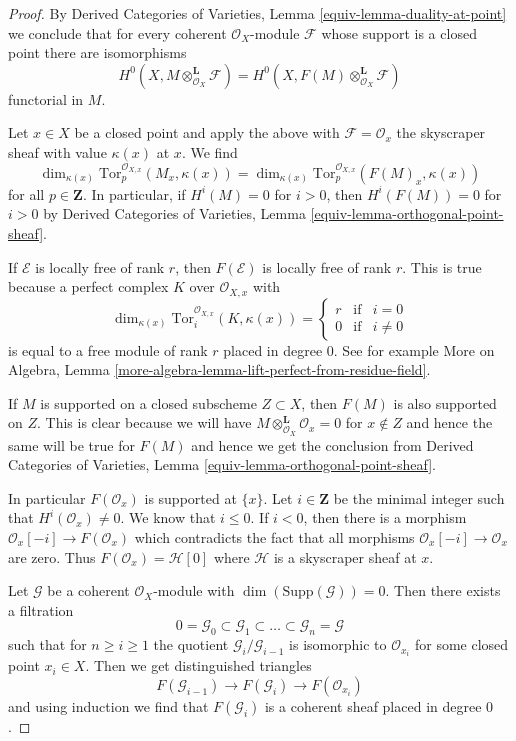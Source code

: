 \begin{proof}
By Derived Categories of Varieties, Lemma \ref{equiv-lemma-duality-at-point}
we conclude that for every
coherent $\mathcal{O}_X$-module $\mathcal{F}$ whose support is a
closed point there are isomorphisms
$$
H^0(X, M \otimes^\mathbf{L}_{\mathcal{O}_X} \mathcal{F}) =
H^0(X, F(M) \otimes^\mathbf{L}_{\mathcal{O}_X} \mathcal{F})
$$
functorial in $M$.

\medskip\noindent
Let $x \in X$ be a closed point and apply the above with
$\mathcal{F} = \mathcal{O}_x$ the skyscraper sheaf with value
$\kappa(x)$ at $x$. We find
$$
\dim_{\kappa(x)} 
\text{Tor}^{\mathcal{O}_{X, x}}_p(M_x, \kappa(x)) =
\dim_{\kappa(x)} 
\text{Tor}^{\mathcal{O}_{X, x}}_p(F(M)_x, \kappa(x))
$$
for all $p \in \mathbf{Z}$. In particular, if
$H^i(M) = 0$ for $i > 0$, then $H^i(F(M)) = 0$ for $i > 0$
by Derived Categories of Varieties, Lemma
\ref{equiv-lemma-orthogonal-point-sheaf}.

\medskip\noindent
If $\mathcal{E}$ is locally free of rank $r$, then
$F(\mathcal{E})$ is locally free of rank $r$. This is
true because a perfect complex $K$ over $\mathcal{O}_{X, x}$
with
$$
\dim_{\kappa(x)} \text{Tor}^{\mathcal{O}_{X, x}}_i(K, \kappa(x)) =
\left\{
\begin{matrix}
r & \text{if} & i = 0 \\
0 & \text{if} & i \not = 0
\end{matrix}
\right.
$$
is equal to a free module of rank $r$ placed in degree $0$. See
for example More on Algebra, Lemma
\ref{more-algebra-lemma-lift-perfect-from-residue-field}.

\medskip\noindent
If $M$ is supported on a closed subscheme $Z \subset X$, then
$F(M)$ is also supported on $Z$. This is clear because
we will have $M \otimes_{\mathcal{O}_X}^\mathbf{L} \mathcal{O}_x = 0$
for $x \not \in Z$ and hence the same will be true for $F(M)$
and hence we get the conclusion from
Derived Categories of Varieties, Lemma
\ref{equiv-lemma-orthogonal-point-sheaf}.

\medskip\noindent
In particular $F(\mathcal{O}_x)$ is supported at $\{x\}$.
Let $i \in \mathbf{Z}$ be the minimal integer such that
$H^i(\mathcal{O}_x) \not = 0$. We know that $i \leq 0$.
If $i < 0$, then there is a morphism
$\mathcal{O}_x[-i] \to F(\mathcal{O}_x)$
which contradicts the fact that all morphisms
$\mathcal{O}_x[-i] \to \mathcal{O}_x$ are zero.
Thus $F(\mathcal{O}_x) = \mathcal{H}[0]$ where
$\mathcal{H}$ is a skyscraper sheaf at $x$.

\medskip\noindent
Let $\mathcal{G}$ be a coherent $\mathcal{O}_X$-module with
$\dim(\text{Supp}(\mathcal{G})) = 0$. Then there exists a
filtration
$$
0 = \mathcal{G}_0 \subset \mathcal{G}_1 \subset \ldots \subset
\mathcal{G}_n = \mathcal{G}
$$
such that for $n \geq i \geq 1$ the quotient $\mathcal{G}_i/\mathcal{G}_{i - 1}$
is isomorphic to $\mathcal{O}_{x_i}$ for some closed point $x_i \in X$.
Then we get distinguished triangles
$$
F(\mathcal{G}_{i - 1}) \to F(\mathcal{G}_i) \to F(\mathcal{O}_{x_i})
$$
and using induction we find that $F(\mathcal{G}_i)$ is a
coherent sheaf placed in degree $0$.


\end{proof}
